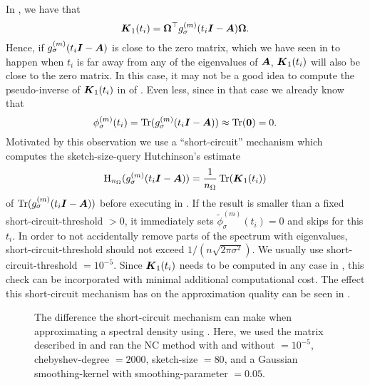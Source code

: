 In , we have that
\begin{equation}
    \boldsymbol{K}_1(t_i) = \boldsymbol{\Omega}^{\top} g_{\sigma}^{(m)}(t_i\boldsymbol{I} - \boldsymbol{A}) \boldsymbol{\Omega}.
    \label{equ:3-nystrom-interpolated-matrix}
\end{equation}
Hence, if $g_{\sigma}^{(m)}(t_i\boldsymbol{I} - \boldsymbol{A})$ is close to the zero matrix,
which we have seen in  to happen when
$t_i$ is far away from any of the eigenvalues of $\boldsymbol{A}$, $\boldsymbol{K}_1(t_i)$ will
also be close to the zero matrix. In this case, it may not be a good idea to
compute the pseudo-inverse of $\boldsymbol{K}_1(t_i)$ in 
of . Even less, since in that case we already know that
\begin{equation}
    \phi_{\sigma}^{(m)}(t_i) = \operatorname{Tr}(g_{\sigma}^{(m)}(t_i\boldsymbol{I} - \boldsymbol{A})) \approx \operatorname{Tr}(\boldsymbol{0}) = 0.
    \label{equ:3-nystrom-short-circuit}
\end{equation}
Motivated by this observation we use a \enquote{short-circuit} mechanism which 
computes the \gls{sketch-size}-query Hutchinson's estimate 
\begin{equation}
    \operatorname{H}_{n_{\Omega}}(g_{\sigma}^{(m)}(t_i \boldsymbol{I} - \boldsymbol{A})) = \frac{1}{n_{\Omega}} \operatorname{Tr}(\boldsymbol{K}_1(t_i))
    \label{equ:3-nystrom-short-circuit-hutchinson}
\end{equation}
of $\operatorname{Tr}(g_{\sigma}^{(m)}(t_i\boldsymbol{I} - \boldsymbol{A}))$
before executing  in .
If the result is smaller than a fixed \gls{short-circuit-threshold} $> 0$, it immediately sets
$\widetilde{\phi}_{\sigma}^{(m)}(t_i)=0$ and skips 
for this $t_i$. In order to not accidentally remove parts of the spectrum with eigenvalues,
\gls{short-circuit-threshold} should not exceed $1/(n \sqrt{2\pi \sigma^2})$.
We usually use \gls{short-circuit-threshold} $= 10^{-5}$. Since $\boldsymbol{K}_1(t_i)$
needs to be computed in any case in ,
this check can be incorporated with minimal additional computational cost. The effect this short-circuit
mechanism has on the approximation quality can be seen in .\\

\begin{figure}[ht]
    \centering
    
    \caption{The difference the short-circuit mechanism can make when approximating
        a spectral density using . 
        Here, we used the matrix described in 
        and ran the \gls{NC} method with and without  $= 10^{-5}$,
        \gls{chebyshev-degree} $=2000$, \gls{sketch-size} $=80$, and a
        Gaussian \gls{smoothing-kernel} with \gls{smoothing-parameter} $=0.05$.}
    \label{fig:3-nystrom-short-circuit-mechanism}
\end{figure}

